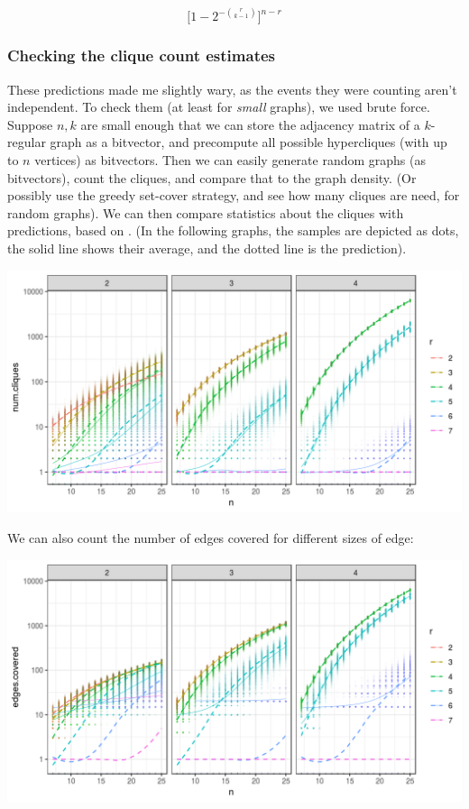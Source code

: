 \documentclass[12pt]{article}
\theoremstyle{definition}
\begin{document}
\[
\Big[1 - 2^{-{r \choose {k-1}}}\Big]^{n - r}
\]


\subsubsection{Checking the clique count estimates}

These predictions made me slightly wary, as the events they were counting
aren't independent.
To check them (at least for {\em small} graphs), we used brute force.
Suppose $n, k$ are small enough that we can 
store the adjacency matrix of a $k$-regular graph as a bitvector, and precompute
all possible hypercliques
(with up to $n$ vertices) as bitvectors. Then we can easily generate
random graphs (as bitvectors), count the cliques, and compare that to the graph
density. (Or possibly use the greedy set-cover strategy, and see how
many cliques are need, for random graphs).
We can then compare statistics about the cliques with predictions,
based on \cite{bollobas1976cliques}.
(In the following graphs, the samples are depicted as dots,
the solid line shows their average, and the
dotted line is the prediction).

\includegraphics[width=1\textwidth]{cliqueCounter/R/numCliques.png}

We can also count the number of edges covered for different sizes
of edge:

\includegraphics[width=1\textwidth]{cliqueCounter/R/edgesCovered.png}
\end{document}
